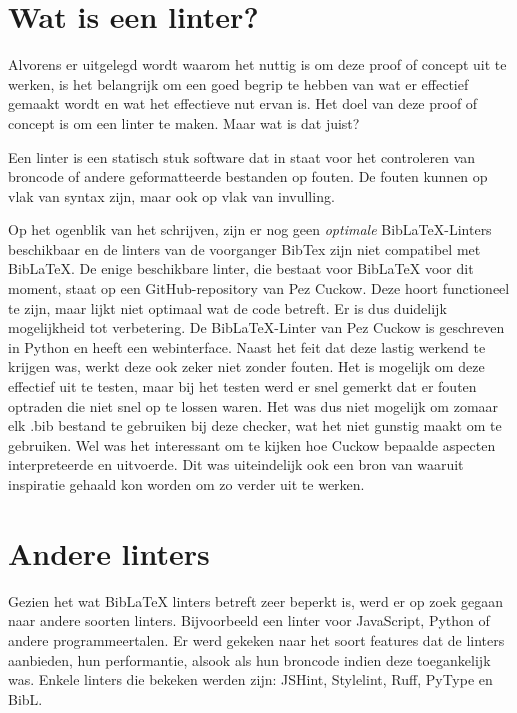 \section{Wat is een linter?}
Alvorens er uitgelegd wordt waarom het nuttig is om deze proof of concept uit te werken, is het belangrijk om een goed begrip te hebben van wat er effectief gemaakt wordt en wat het effectieve nut ervan is. Het doel van deze proof of concept is om een linter te maken. Maar wat is dat juist?

Een linter is een statisch stuk software dat in staat voor het controleren van broncode of andere geformatteerde bestanden op fouten. De fouten kunnen op vlak van syntax zijn, maar ook op vlak van invulling.



Op het ogenblik van het schrijven, zijn er nog geen \emph{optimale} BibLaTeX-Linters beschikbaar en de linters van de voorganger BibTex zijn niet compatibel met BibLaTeX. De enige beschikbare linter, die bestaat voor BibLaTeX voor dit moment, staat op een GitHub-repository van Pez Cuckow. Deze hoort functioneel te zijn, maar lijkt niet optimaal wat de code betreft. Er is dus duidelijk mogelijkheid tot verbetering. De BibLaTeX-Linter van Pez Cuckow is geschreven in Python en heeft een webinterface.\autocite{Cuckow2022} Naast het feit dat deze lastig werkend te krijgen was, werkt deze ook zeker niet zonder fouten. Het is mogelijk om deze effectief uit te testen, maar bij het testen werd er snel gemerkt dat er fouten optraden die niet snel op te lossen waren. Het was dus niet mogelijk om zomaar elk .bib bestand te gebruiken bij deze checker, wat het niet gunstig maakt om te gebruiken. Wel was het interessant om te kijken hoe Cuckow bepaalde aspecten interpreteerde en uitvoerde. Dit was uiteindelijk ook een bron van waaruit inspiratie gehaald kon worden om zo verder uit te werken.


\section{Andere linters}
Gezien het wat BibLaTeX linters betreft zeer beperkt is, werd er op zoek gegaan naar andere soorten linters. Bijvoorbeeld een linter voor JavaScript, Python of andere programmeertalen. Er werd gekeken naar het soort features dat de linters aanbieden, hun performantie, alsook als hun broncode indien deze toegankelijk was. Enkele linters die bekeken werden zijn: JSHint, Stylelint, Ruff, PyType en BibL.

